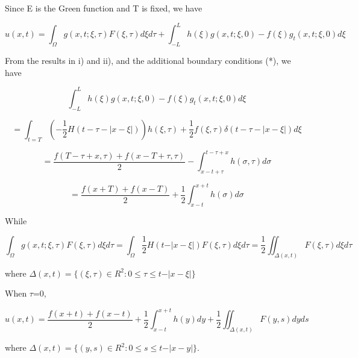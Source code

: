 \documentclass{article}
\begin{document}
\subsection{}

Since E is the Green function and T is fixed, we have


\[
u\left(x,t\right)=\int_{\Omega{}}g(x,t;\xi{},\tau{})F(\xi{},\tau{})d\xi{}d\tau{}+\int_{-L}^Lh\left(\xi{}\right)g\left(x,t;\xi{},0\right)-f(\xi{})g_t\left(x,t;\xi{},0\right)d\xi{}
\]


From the results in i) and ii), and the additional boundary conditions (*), we
have


\[
\int_{-L}^Lh\left(\xi{}\right)g\left(x,t;\xi{},0\right)-f\left(\xi{}\right)g_t\left(x,t;\xi{},0\right)d\xi{}
\]



\[
=\int_{t=T}\left(-\frac{1}{2}H\left(t-\tau{}-\left\vert{}x-\xi{}\right\vert{}\right)\right)h\left(\xi{},\tau{}\right)+\frac{1}{2}f\left(\xi{},\tau{}\right)\delta{}\left(t-\tau{}-\left\vert{}x-\xi{}\right\vert{}\right)d\xi{}
\]



\[
=\frac{f\left(T-\tau{}+x,\tau{}\right)+f\left(x-T+\tau{},\tau{}\right)}{2}-\int_{x-t+\tau{}}^{t-\tau{}+x}h\left(\sigma{},\tau{}\right)d\sigma{}
\]



\[
=\frac{f\left(x+T\right)+f\left(x-T\right)}{2}+\frac{1}{2}\int_{x-t}^{x+t}h\left(\sigma{}\right)d\sigma{}
\]


While


\[
\int_{\Omega{}}g(x,t;\xi{},\tau{})F(\xi{},\tau{})d\xi{}d\tau{}=\int_{\Omega{}}\frac{1}{2}H(t-\vert{}x-\xi{}\vert{})F(\xi{},\tau{})d\xi{}d\tau{}=\frac{1}{2}\iint_{\Delta{}(x,t)}F(\xi{},\tau{})d\xi{}d\tau{}
\]


where
$\Delta{}\left(x,t\right)=\{(\xi{},\tau{})\in{}R^2:0\leq{}\tau{}\leq{}t-\vert{}x-\xi{}\vert{}\}$

When $\tau{}$=0,


\[
u\left(x,t\right)=\frac{f\left(x+t\right)+f\left(x-t\right)}{2}+\frac{1}{2}\int_{x-t}^{x+t}h\left(y\right)dy+\frac{1}{2}\iint_{\Delta{}(x,t)}F(y,s)dyds
\]


where
$\Delta{}\left(x,t\right)=\{(y,s)\in{}R^2:0\leq{}s\leq{}t-\vert{}x-y\vert{}\}$.
\end{document}
